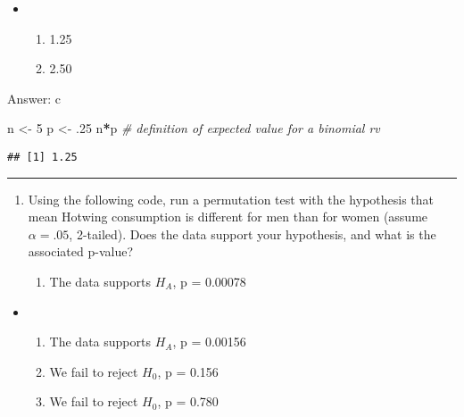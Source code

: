\documentclass[]{article}
\newenvironment{Shaded}{\begin{snugshade}}{\end{snugshade}}
\newcommand{\DecValTok}[1]{\textcolor[rgb]{0.00,0.00,0.81}{#1}}
\newcommand{\StringTok}[1]{\textcolor[rgb]{0.31,0.60,0.02}{#1}}
\newcommand{\CommentTok}[1]{\textcolor[rgb]{0.56,0.35,0.01}{\textit{#1}}}
\newcommand{\OperatorTok}[1]{\textcolor[rgb]{0.81,0.36,0.00}{\textbf{#1}}}
\newcommand{\NormalTok}[1]{#1}
\providecommand{\tightlist}{%
  \setlength{\itemsep}{0pt}\setlength{\parskip}{0pt}}
\begin{document}
\begin{itemize}
\item
  \begin{enumerate}
  \def\labelenumi{\alph{enumi}.}
  \setcounter{enumi}{2}
  \tightlist
  \item
    1.25
  \item
    2.50
  \end{enumerate}
\end{itemize}

Answer: c

\begin{Shaded}
\begin{Highlighting}[]
\NormalTok{n <-}\StringTok{ }\DecValTok{5}
\NormalTok{p <-}\StringTok{ }\NormalTok{.}\DecValTok{25}
\NormalTok{n}\OperatorTok{*}\NormalTok{p }\CommentTok{# definition of expected value for a binomial rv}
\end{Highlighting}
\end{Shaded}

\begin{verbatim}
## [1] 1.25
\end{verbatim}

\begin{center}\rule{0.5\linewidth}{\linethickness}\end{center}

\begin{enumerate}
\def\labelenumi{\arabic{enumi}.}
\setcounter{enumi}{29}
\item
  Using the following code, run a permutation test with the hypothesis
  that mean Hotwing consumption is different for men than for women
  (assume \(\alpha = .05\), 2-tailed). Does the data support your
  hypothesis, and what is the associated p-value?

  \begin{enumerate}
  \def\labelenumii{\alph{enumii}.}
  \tightlist
  \item
    The data supports \(H_A\), p = 0.00078
  \end{enumerate}
\end{enumerate}

\begin{itemize}
\item
  \begin{enumerate}
  \def\labelenumi{\alph{enumi}.}
  \setcounter{enumi}{1}
  \tightlist
  \item
    The data supports \(H_A\), p = 0.00156
  \item
    We fail to reject \(H_0\), p = 0.156
  \item
    We fail to reject \(H_0\), p = 0.780
  \end{enumerate}
\end{itemize}
\end{document}

